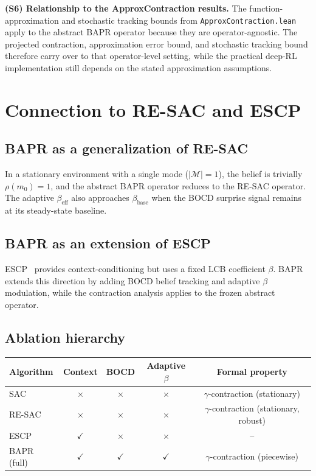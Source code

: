\medskip
\noindent\textbf{(S6) Relationship to the ApproxContraction results.}
The function-approximation and stochastic tracking bounds from \texttt{ApproxContraction.lean} apply to the abstract BAPR operator because they are operator-agnostic. The projected contraction, approximation error bound, and stochastic tracking bound therefore carry over to that operator-level setting, while the practical deep-RL implementation still depends on the stated approximation assumptions.


\section{Connection to RE-SAC and ESCP}
\label{app:connection}

\subsection{BAPR as a generalization of RE-SAC}

In a stationary environment with a single mode ($|\mathcal{M}| = 1$), the belief is trivially $\rho(m_0) = 1$, and the abstract BAPR operator reduces to the RE-SAC operator. The adaptive $\beta_{\text{eff}}$ also approaches $\beta_{\text{base}}$ when the BOCD surprise signal remains at its steady-state baseline.

\subsection{BAPR as an extension of ESCP}

ESCP~\cite{Luo2022ESCP} provides context-conditioning but uses a fixed LCB coefficient $\beta$. BAPR extends this direction by adding BOCD belief tracking and adaptive $\beta$ modulation, while the contraction analysis applies to the frozen abstract operator.

\subsection{Ablation hierarchy}
\begin{center}
\begin{tabular}{lcccc}
\toprule
\textbf{Algorithm} & \textbf{Context} & \textbf{BOCD} & \textbf{Adaptive $\beta$} & \textbf{Formal property} \\
\midrule
SAC & $\times$ & $\times$ & $\times$ & $\gamma$-contraction (stationary) \\
RE-SAC & $\times$ & $\times$ & $\times$ & $\gamma$-contraction (stationary, robust) \\
ESCP & $\checkmark$ & $\times$ & $\times$ & -- \\
BAPR (full) & $\checkmark$ & $\checkmark$ & $\checkmark$ & $\gamma$-contraction (piecewise) \\
\bottomrule
\end{tabular}
\end{center}


